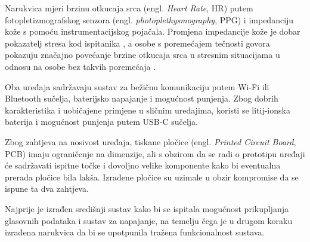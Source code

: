 Narukvica mjeri brzinu otkucaja srca (engl. \textit{Heart Rate}, HR) putem fotopletizmografskog senzora (engl. \textit{photoplethysmography}, PPG) i impedanciju kože s pomoću instrumentacijskog pojačala. Promjena impedancije kože je dobar pokazatelj stresa kod ispitanika \cite{edr}, a osobe s poremećajem tečnosti govora pokazuju značajno povećanje brzine otkucaja srca u stresnim situacijama u odnosu na osobe bez takvih poremećaja \cite{ALM2004123}.

Oba uređaja sadržavaju sustav za bežičnu komunikaciju putem Wi-Fi ili Bluetooth sučelja, baterijsko napajanje i mogućnost punjenja. Zbog dobrih karakteristika i uobičajene primjene u sličnim uređajima, koristi se litij-ionska baterija i mogućnost punjenja putem USB-C sučelja.

Zbog zahtjeva na nosivost uređaja, tiskane pločice (engl. \textit{Printed Circuit Board}, PCB) imaju ograničenje na dimenzije, ali s obzirom  da se radi o prototipu uređaji će sadržavati ispitne točke i dovoljno velike komponente kako bi eventualna prerada pločice bila lakša. Izrađene pločice su uzimale u obzir kompromise da se ispune ta dva zahtjeva.

Najprije je izrađen središnji sustav kako bi se ispitala mogućnost prikupljanja glasovnih podataka i sustav za napajanje, na temelju čega je u drugom koraku izrađena narukvica da bi se upotpunila tražena funkcionalnost sustava.